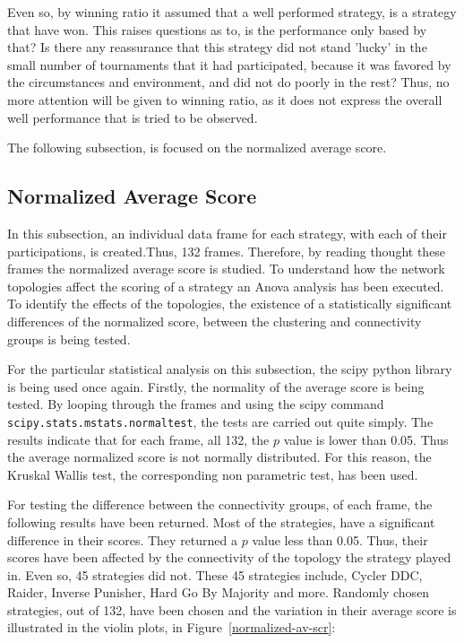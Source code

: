 Even so, by winning ratio it assumed that a well performed strategy, is a strategy
that have won. This raises questions as to, is the performance only based by that?
Is there any reassurance that this strategy did not stand 'lucky' in the small
number of tournaments that it had participated, because it was favored by
the circumstances and environment, and did not do poorly in the rest?
Thus, no more attention will be given to winning ratio, as it does not express
the overall well performance that is tried to be observed.

The following subsection, is focused on the normalized average score.

\subsection{Normalized Average Score}
\label{sub:chap-four-normalized-score}
In this subsection, an individual data frame for each strategy, with each of
their participations, is created.Thus, 132 frames. Therefore, by reading thought
these frames
the normalized average score is studied. To understand how the network topologies
affect the scoring of a strategy an Anova analysis has been executed.
To identify the effects of the topologies, the existence of a
statistically significant differences of the normalized score, between the
clustering and connectivity groups is being tested.

For the particular statistical analysis on this subsection, the scipy
python library is being used once again. Firstly, the normality of the average
score is being tested. By looping through the frames and using the scipy
command \texttt{scipy.stats.mstats.normaltest}, the tests are carried out quite simply.
The results indicate that for
each frame, all 132, the \(p\) value is lower than 0.05. Thus the average normalized
score is not normally distributed. For this reason, the Kruskal Wallis test, the
corresponding non parametric test, has been used.

For testing the difference between the connectivity groups, of each frame,
the following results have been returned. Most of the strategies, have a significant
difference in their scores. They returned a \(p\) value less than 0.05.
Thus, their scores have been affected by the connectivity  of the topology the
strategy played in. Even so, 45 strategies did not. These 45 strategies include,
Cycler DDC, Raider, Inverse Punisher, Hard Go By Majority and more. Randomly
chosen strategies, out of 132, have been chosen and the variation in their average
score is illustrated in the violin plots, in Figure~\ref{normalized-av-scr}:

